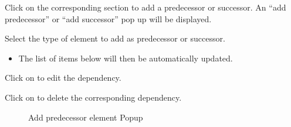 \documentclass[letterpaper,10pt,english]{sphinxmanual}
\begin{document}
Click  on the corresponding section to add a predecessor or successor. An “add predecessor” or “add successor” pop up will be displayed.

Select the type of element to add as predecessor or successor.
\begin{itemize}
\item {} 
The list of items below will then be automatically updated.

\end{itemize}

Click on  to edit the dependency.

Click on  to delete the corresponding dependency.
\begin{figure}[htbp]
\centering
\capstart

\caption{Add predecessor element Popup}\end{figure}
\end{document}
